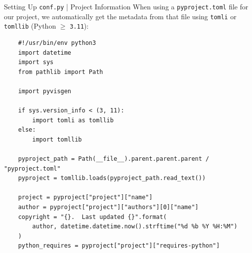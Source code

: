 \begin{frame}[fragile]{Setting Up \texttt{conf.py} | Project Information}
  When using a \texttt{pyproject.toml} file for our project, we automatically get the metadata
  from that file using \texttt{tomli} or \texttt{tomllib} (Python $\geqslant$ \texttt{3.11}):
  {
  \footnotesize
  \begin{verbatim}
    #!/usr/bin/env python3
    import datetime
    import sys
    from pathlib import Path

    import pyvisgen

    if sys.version_info < (3, 11):
        import tomli as tomllib
    else:
        import tomllib

    pyproject_path = Path(__file__).parent.parent.parent / "pyproject.toml"
    pyproject = tomllib.loads(pyproject_path.read_text())

    project = pyproject["project"]["name"]
    author = pyproject["project"]["authors"][0]["name"]
    copyright = "{}.  Last updated {}".format(
        author, datetime.datetime.now().strftime("%d %b %Y %H:%M")
    )
    python_requires = pyproject["project"]["requires-python"]
  \end{verbatim}
  }
\end{frame}


